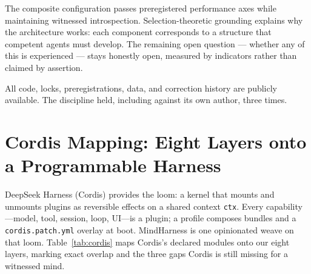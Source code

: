 \documentclass[11pt]{article}
\begin{document}
The composite configuration passes preregistered performance axes while
maintaining witnessed introspection. Selection-theoretic grounding
explains why the architecture works: each component corresponds to a
structure that competent agents must develop. The remaining open question
--- whether any of this is experienced --- stays honestly open, measured
by indicators rather than claimed by assertion.

All code, locks, preregistrations, data, and correction history are
publicly available. The discipline held, including against its own
author, three times.

\appendix
\section{Cordis Mapping: Eight Layers onto a Programmable Harness}
\label{app:cordis}

DeepSeek Harness (Cordis) provides the loom: a kernel that mounts and
unmounts plugins as reversible effects on a shared context \texttt{ctx}.
Every capability---model, tool, session, loop, UI---is a plugin; a
profile composes bundles and a \texttt{cordis.patch.yml} overlay at boot.
MindHarness is one opinionated weave on that loom. Table~\ref{tab:cordis}
maps Cordis's declared modules onto our eight layers, marking exact
overlap and the three gaps Cordis is still missing for a witnessed mind.
\end{document}
